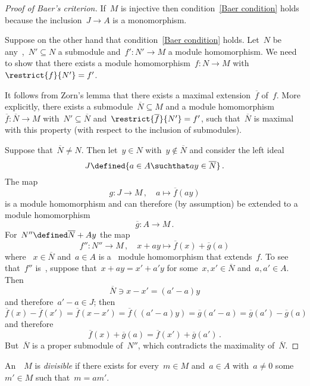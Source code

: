 \begin{proof}[Proof of Baer’s criterion]
  If~$M$ is injective then condition~\ref*{Baer condition} holds because the inclusion~$J \to A$ is a monomorphism.
  
  Suppose on the other hand that condition~\ref*{Baer condition} holds.
  Let~$N$ be any~{},~$N' \subseteq N$ a submodule and~$f' \colon N' \to M$ a module homomorphism.
  We need to show that there exists a module homomorphism~$f \colon N \to M$ with~$\restrict{f}{N'} = f'$.
  
  It follows from Zorn’s lemma that there exists a maximal extension~$\overline{f}$ of~$f$.
  More explicitly, there exists a submodule~$\overline{N} \subseteq M$ and a module homomorphism~$\overline{f} \colon \overline{N} \to M$ with~$N' \subseteq \overline{N}$ and~$\restrict{\overline{f}}{N'} = f'$, such that~$\overline{N}$ is maximal with this property (with respect to the inclusion of submodules).
  
  Suppose that~$\overline{N} \neq N$.
  Then let~$y \in N$ with~$y \notin \overline{N}$ and consider the left ideal
  \[
    J
    \defined
    \{
      a \in A
    \suchthat
      a y \in \overline{N}
    \}  \,.
  \]
  The map
  \[
    g
    \colon
    J
    \to
    M \,,
    \quad
    a
    \mapsto
    \overline{f}(a y)
  \]
  is a module homomorphism and can therefore (by assumption) be extended to a module homomorphism
  \[
    \overline{g}
    \colon
    A
    \to
    M \,.
  \]
  For~$N'' \defined \overline{N} + A y$ the map
  \[
    f''
    \colon
    N''
    \to
    M \,,
    \quad
    x + a y
    \mapsto
    \overline{f}(x) + \overline{g}(a)
  \]
  where ~$x \in \overline{N}$ and~$a \in A$ is a~{\welldef} module homomorphism that extends~$f$.
  To see that~$f''$ is~{\welldef}, suppose that~$x + ay = x' + a'y$ for some~$x, x' \in \overline{N}$ and~$a, a' \in A$.
  Then
  \[
    \overline{N}
    \ni
    x - x'
    =
    (a' - a)y
  \]
  and therefore~$a' - a \in J$;
  then
  \[
      \overline{f}(x) - \overline{f}(x')
    =
    \overline{f}(x - x')
    =
    \overline{f}( (a' - a) y )
    =
    \overline{g}(a' - a)
    =
    \overline{g}(a') - \overline{g}(a)
  \]
  and therefore
  \[
    \overline{f}(x) + \overline{g}(a)
    =
    \overline{f}(x') + \overline{g}(a') \,.
  \]
  But~$\overline{N}$ is a proper submodule of~$N''$, which contradicts the maximality of~$\overline{N}$.
\end{proof}


\begin{definition*}
  An~{}~$M$ is \emph{divisible} if there exists for every~$m \in M$ and~$a \in A$ with~$a \neq 0$ some~$m' \in M$ such that~$m = a m'$.
\end{definition*}


